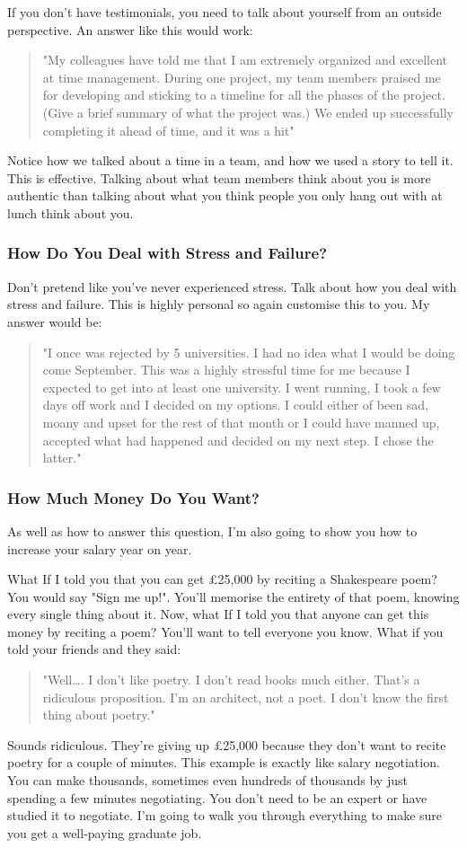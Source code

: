 \documentclass{article}
\begin{document}
If you don't have testimonials, you need to talk about yourself from an
outside perspective. An answer like this would work:
\begin{quote}
    "My colleagues have told me that I am extremely organized and excellent
at time management. During one project, my team members praised me for
developing and sticking to a timeline for all the phases of the project.
(Give a brief summary of what the project was.) We ended up successfully
completing it ahead of time, and it was a hit"
\end{quote}
Notice how we talked about a time in a team, and how we used a story to
tell it. This is effective. Talking about what team members think about
you is more authentic than talking about what you think people you only
hang out with at lunch think about you.

\subsubsection{How Do You Deal with Stress and Failure?}
Don't pretend like you've never experienced stress. Talk about how you
deal with stress and failure. This is highly personal so again customise
this to you. My answer would be:
\begin{quote}
    "I once was rejected by 5 universities. I had no idea what I would be
doing come September.
This was a highly stressful time for me because I expected to get into
at least one university. I went running, I took a few days off work and
I decided on my options. I could either of been sad, moany and upset for
the rest of that month or I could have manned up, accepted what had
happened and decided on my next step. I chose the latter."
\end{quote}

\subsubsection{How Much Money Do You Want?}
As well as how to answer this question, I'm also going to show you how
to increase your salary year on year.

What If I told you that you can get £25,000 by reciting a Shakespeare
poem? You would say "Sign me up!". You'll memorise the entirety of
that poem, knowing every single thing about it. Now, what If I told you
that anyone can get this money by reciting a poem? You'll want to tell
everyone you know. What if you told your friends and they said:
\begin{quote}
    "Well\ldots. I don't like poetry. I don't read books much either.
That's a ridiculous proposition. I'm an architect, not a poet. I don't
know the first thing about poetry."
\end{quote}
Sounds ridiculous. They're giving up £25,000 because they don't want to
recite poetry for a couple of minutes. This example is exactly like
salary negotiation. You can make thousands, sometimes even hundreds of
thousands by just spending a few minutes negotiating. You don't need to
be an expert or have studied it to negotiate. I'm going to walk you
through everything to make sure you get a well-paying graduate job.
\end{document}
